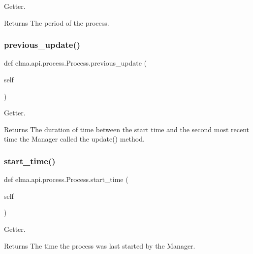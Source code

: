 Getter. 

\begin{DoxyReturn}{Returns}
The period of the process. 
\end{DoxyReturn}
\mbox{\label{classelma_1_1api_1_1process_1_1Process_a47488e16165e28243766c7a6f5a51e32}} 
\subsubsection{\texorpdfstring{previous\+\_\+update()}{previous\_update()}}
{\footnotesize\ttfamily def elma.\+api.\+process.\+Process.\+previous\+\_\+update (\begin{DoxyParamCaption}\item[{}]{self }\end{DoxyParamCaption})}



Getter. 

\begin{DoxyReturn}{Returns}
The duration of time between the start time and the second most recent time the Manager called the update() method. 
\end{DoxyReturn}
\mbox{\label{classelma_1_1api_1_1process_1_1Process_aa37c2ece596b3580990332709564345f}} 
\subsubsection{\texorpdfstring{start\+\_\+time()}{start\_time()}}
{\footnotesize\ttfamily def elma.\+api.\+process.\+Process.\+start\+\_\+time (\begin{DoxyParamCaption}\item[{}]{self }\end{DoxyParamCaption})}



Getter. 

\begin{DoxyReturn}{Returns}
The time the process was last started by the Manager. 
\end{DoxyReturn}
\mbox{\label{classelma_1_1api_1_1process_1_1Process_a6dc2725cd3d032b3ec80e0fc6c52a994}} 
